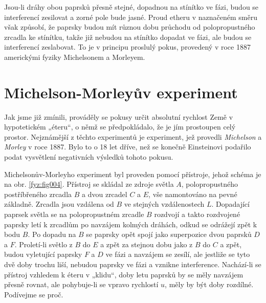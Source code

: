 
    Jsou-li dráhy obou paprsků přesně stejné, dopadnou na stínítko ve fázi, budou se interferencí
    zesilovat a zorné pole bude jasné. Proud etheru v naznačeném směru však způsobí, že paprsky
    budou mít různou dobu průchodu od polopropustného zrcadla ke stínítku, takže již nebudou na
    stínítko dopadat ve fázi, ale budou se interferencí zeslabovat. To je v principu proslulý pokus,
    provedený v roce 1887 americkými fyziky Michelsonem a Morleyem.

  
  \section{Michelson-Morleyův experiment}\label{fyz:IchapXVsecV}
    Jak jsme již zmínili, prováděly se pokusy určit absolutní rychlost Země v hypotetickém „éteru“, 
    o němž se předpokládalo, že je jím prostoupen celý prostor. Nejznámější z těchto experimentů je 
    experiment, jež provedli \emph{Michelson} a \emph{Morley} v roce \num{1887}. Bylo to o \num{18} 
    let dříve, než se konečně Einsteinovi podařilo podat vysvětlení negativních výsledků tohoto 
    pokusu.

    Michelsonův-Morleyho experiment byl proveden pomocí přístroje, jehož schéma je na obr. 
    \ref{fyz:fig004}. Přístroj se skládal ze zdroje světla \(A\), polopropustného postříbřeného 
    zrcadla \(B\) a dvou zrcadel \(C\) a \(E\), vše namontováno na pevné základně. Zrcadla jsou 
    vzdálena od \(B\) ve stejných vzdálenostech \(L\). Dopadající paprsek světla se na 
    polopropustném zrcadle \(B\) rozdvojí a takto rozdvojené paprsky letí k zrcadlům po navzájem 
    kolmých dráhách, odkud se odrážejí zpět k bodu \(B\). Po dopadu na \(B\) se paprsky opět spojí 
    jako superpozice dvou paprsků \(D\) a \(F\). Proletí-li světlo z \(B\) do \(E\) a zpět za 
    stejnou dobu jako z \(B\) do \(C\) a zpět, budou vyletující paprsky \(F\) a \(D\) ve fázi a 
    navzájem se zesílí, ale jestliže se tyto dvě doby trochu liší, nebudou paprsky ve fázi a 
    vznikne interference. Nachází-li se přístroj vzhledem k éteru v „klidu“, doby letu paprsků by 
    se měly navzájem přesně rovnat, ale pohybuje-li se vpravo rychlostí \(u\), měly by být doby 
    rozdílné. Podívejme se proč.
    
